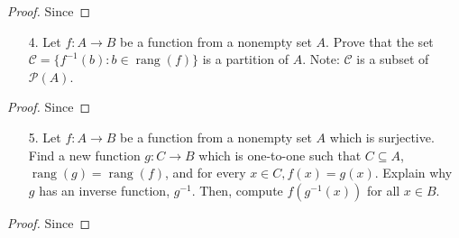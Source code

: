 \documentclass[10pt]{article}
\theoremstyle{definition}
\theoremstyle{plain}
\DeclareMathOperator\rang{rang}
\begin{document}
\begin{proof}
  Since
\end{proof}



\pagebreak



\begin{enumerate}
\item[4.] Let $f:A \to B$ be a function from a nonempty set $A$.  Prove that the set $ \mathcal{C} = \{f^{-1}(b): b \in \rang(f)\}$ is a partition of $A$.  Note:  $\mathcal{C}$ is a subset of $\mathscr{P}(A)$.
\end{enumerate}



\begin{proof}
  Since
\end{proof}



\pagebreak



\begin{enumerate}
\item[5.] Let $f:A \to B$ be a function from a nonempty set $A$ which is surjective.  Find a new function $g:C \to B$ which is one-to-one such that $C \subseteq A$, $\rang(g) = \rang(f)$, and for every $x \in C, f(x) = g(x)$.  Explain why $g$ has an inverse function, $g^{-1}$.  Then, compute $f(g^{-1}(x))$ for all $x \in B$.
\end{enumerate}



\begin{proof}
  Since
\end{proof}
\end{document}
